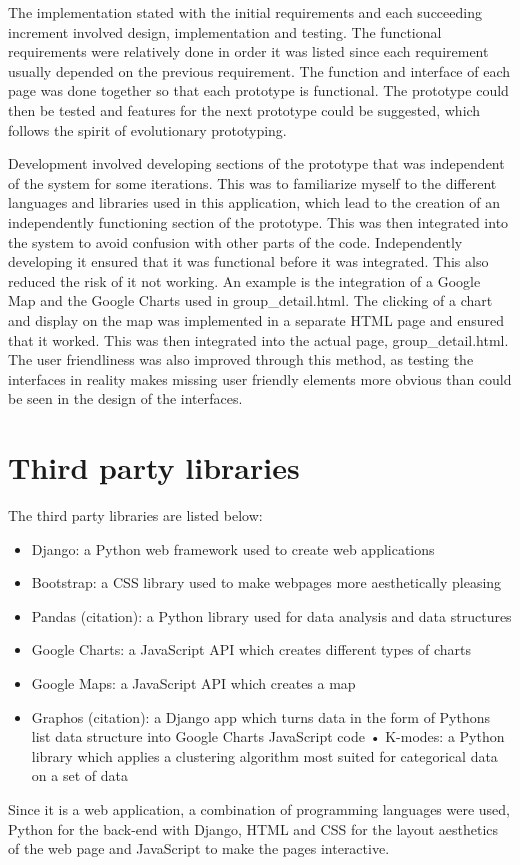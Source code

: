 The implementation stated with the initial requirements and each succeeding increment involved design, implementation and testing. The functional requirements were relatively done in order it was listed since each requirement usually depended on the previous requirement. The function and interface of each page was done together so that each prototype is functional. The prototype could then be tested and features for the next prototype could be suggested, which follows the spirit of evolutionary prototyping. \par 

Development involved developing sections of the prototype that was independent of the system for some iterations. This was to familiarize myself to the different languages and libraries used in this application, which lead to the creation of an independently functioning section of the prototype. This was then integrated into the system to avoid confusion with other parts of the code. Independently developing it ensured that it was functional before it was integrated. This also reduced the risk of it not working.  An example is the integration of a Google Map and the Google Charts used in group\_detail.html. The clicking of a chart and display on the map was implemented in a separate HTML page and ensured that it worked. This was then integrated into the actual page, group\_detail.html. The user friendliness was also improved through this method, as testing the interfaces in reality makes missing user friendly elements more obvious than could be seen in the design of the interfaces.

\section{Third party libraries}
The third party libraries are listed below:
\begin{itemize}
    \item Django: a Python web framework used to create web applications
    \item Bootstrap: a CSS library used to make webpages more aesthetically pleasing
    \item Pandas (citation): a Python library used for data analysis and data structures
    \item Google Charts: a JavaScript API which creates different types of charts
    \item Google Maps: a JavaScript API which creates a map
    \item Graphos (citation): a Django app which turns data in the form of Python\textquotesingle s list data structure into Google Charts JavaScript code
•	K-modes: a Python library which applies a clustering algorithm most suited for categorical data on a set of data
\end{itemize}
Since it is a web application, a combination of programming languages were used, Python for the back-end with Django, HTML and CSS for the layout aesthetics of the web page and JavaScript to make the pages interactive.


